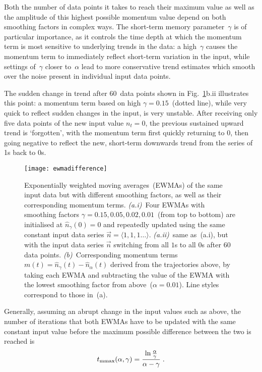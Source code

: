 \documentclass[10pt]{article}
\begin{document}
Both the number of data points it takes to reach their maximum value as well as the amplitude of this highest possible momentum value depend on both smoothing factors in complex ways. The short-term memory parameter~$\gamma$ is of particular importance, as it controls the time depth at which the momentum term is most sensitive to underlying trends in the data: a high~$\gamma$ causes the momentum term to immediately reflect short-term variation in the input, while settings of~$\gamma$ closer to~$\alpha$ lead to more conservative trend estimates which smooth over the noise present in individual input data points.

The sudden change in trend after 60~data points shown in Fig.~\ref{fig:ewmadifference}b.ii illustrates this point: a momentum term based on high $\gamma=0.15$~(dotted line), while very quick to reflect sudden changes in the input, is very unstable. After receiving only five data points of the new input value $n_t=0$, the previous sustained upward trend is `forgotten', with the momentum term first quickly returning to $0$, then going negative to reflect the new, short-term downwards trend from the series of 1s back to 0s. 


\begin{figure}
\centering
\texttt{[image: ewmadifference]}
\caption[Exponentially weighted moving averages~(EWMAs) of the same input data but with different smoothing factors, as well as their corresponding momentum terms]{Exponentially weighted moving averages~(EWMAs) of the same input data but with different smoothing factors, as well as their corresponding momentum terms.
\textit{(a.i)}~Four EWMAs with smoothing factors $\gamma=0.15, 0.05, 0.02, 0.01$~(from top to bottom) are initialised at $\hat{n}_\gamma(0)=0$ and repeatedly updated using the same constant input data series $\vec{n}=\langle1,1,1\dots\rangle$. \textit{(a.ii)}~same as~(a.i), but with the input data series $\vec{n}$ switching from all $1$s to all $0$s after 60 data points. 
\textit{(b)}~Corresponding momentum terms~$m(t)=\hat{n}_\gamma(t)-\hat{n}_\alpha(t)$ derived from the trajectories above, by taking each EWMA and subtracting the value of the EWMA with the lowest smoothing factor from above~($\alpha=0.01$). Line styles correspond to those in~(a).}
\label{fig:ewmadifference}
\end{figure}

Generally, assuming an abrupt change in the input values such as above, the number of iterations that both EWMAs have to be updated with the same constant input value before the maximum possible difference between the two is reached is
\begin{equation}
t_{\rm mmax}(\alpha,\gamma)=\frac{\ln\frac{\alpha}{\gamma}}{\alpha-\gamma}\;.
\end{equation}
\end{document}
